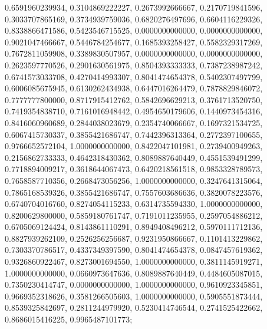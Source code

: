 {{0.6591960239934, 0.3104869222227, 0.2673992666667, 0.2170719841596, 0.3033707865169, 0.3734939759036, 0.6820276497696, 0.6604116229326, 0.8338866471586, 0.5423546715525},
{0.0000000000000, 0.0000000000000, 0.9021047466667, 0.5446784254677, 0.1685393258427, 0.5582329317269, 0.7672811059908, 0.3389830507957, 0.0000000000000, 0.0000000000000},
{0.2623597770526, 0.2901630561975, 0.8504393333333, 0.7387238987242, 0.6741573033708, 0.4270414993307, 0.8041474654378, 0.5402307497799, 0.6006085675945, 0.6130262434938},
{0.6447016264479, 0.7878829846072, 0.7777777800000, 0.8717915412762, 0.5842696629213, 0.3761713520750, 0.7419354838710, 0.7161016948442, 0.4954650179606, 0.1440973454316},
{0.8416060960689, 0.2844038023679, 0.2354740066667, 0.1697321534725, 0.6067415730337, 0.3855421686747, 0.7442396313364, 0.2772397100655, 0.9766652572104, 1.0000000000000},
{0.8422047101981, 0.2739400949263, 0.2156862733333, 0.4642318430362, 0.8089887640449, 0.4551539491299, 0.7718894009217, 0.3618644067473, 0.6420218561518, 0.9853328789573},
{0.7658587710356, 0.2668473056256, 1.0000000000000, 0.3247641315064, 0.7865168539326, 0.3855421686747, 0.7557603686636, 0.3820078223576, 0.6740704016760, 0.8274054115233},
{0.6314735594330, 1.0000000000000, 0.8200629800000, 0.5859180761747, 0.7191011235955, 0.2597054886212, 0.6705069124424, 0.8143861110291, 0.8949408496212, 0.5970111712136},
{0.8827939262109, 0.2526256256687, 0.9231950866667, 0.1101413229862, 0.7303370786517, 0.4337349397590, 0.8041474654378, 0.0847457619362, 0.9326860922467, 0.8273001694550},
{1.0000000000000, 0.3811145919271, 1.0000000000000, 0.0660973647636, 0.8089887640449, 0.4484605087015, 0.7350230414747, 0.0000000000000, 1.0000000000000, 0.9610923345851},
{0.9669352318626, 0.3581266505603, 1.0000000000000, 0.5905551873444, 0.8539325842697, 0.2811244979920, 0.5230414746544, 0.2741525422662, 0.8686015416225, 0.9965487101773}};

